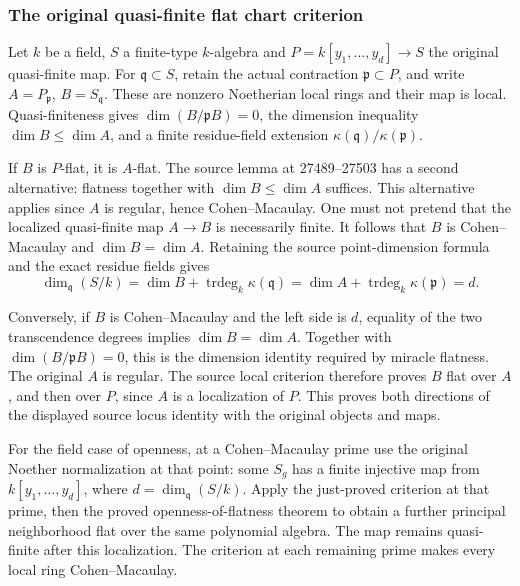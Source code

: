 \subsubsection{The original quasi-finite flat chart criterion}\label{algebra-proof-040-the-original-quasi-finite-flat-chart-criterion}

Let \(k\) be a field, \(S\) a finite-type \(k\)-algebra and \(P=k[y_1,\ldots,y_d]\to S\) the original quasi-finite map. For \(\mathfrak q\subset S\), retain the actual contraction \(\mathfrak p\subset P\), and write \(A=P_{\mathfrak p}\), \(B=S_{\mathfrak q}\). These are nonzero Noetherian local rings and their map is local. Quasi-finiteness gives \(\dim(B/\mathfrak pB)=0\), the dimension inequality \(\dim B\leq\dim A\), and a finite residue-field extension \(\kappa(\mathfrak q)/\kappa(\mathfrak p)\).

If \(B\) is \(P\)-flat, it is \(A\)-flat. The source lemma at 27489--27503 has a second alternative: flatness together with \(\dim B\leq\dim A\) suffices. This alternative applies since \(A\) is regular, hence Cohen--Macaulay. One must not pretend that the localized quasi-finite map \(A\to B\) is necessarily finite. It follows that \(B\) is Cohen--Macaulay and \(\dim B=\dim A\). Retaining the source point-dimension formula and the exact residue fields gives \[
\dim_{\mathfrak q}(S/k)
=\dim B+\operatorname{trdeg}_k\kappa(\mathfrak q)
=\dim A+\operatorname{trdeg}_k\kappa(\mathfrak p)=d.
\]

Conversely, if \(B\) is Cohen--Macaulay and the left side is \(d\), equality of the two transcendence degrees implies \(\dim B=\dim A\). Together with \(\dim(B/\mathfrak pB)=0\), this is the dimension identity required by miracle flatness. The original \(A\) is regular. The source local criterion therefore proves \(B\) flat over \(A\), and then over \(P\), since \(A\) is a localization of \(P\). This proves both directions of the displayed source locus identity with the original objects and maps.

For the field case of openness, at a Cohen--Macaulay prime use the original Noether normalization at that point: some \(S_g\) has a finite injective map from \(k[y_1,\ldots,y_d]\), where \(d=\dim_{\mathfrak q}(S/k)\). Apply the just-proved criterion at that prime, then the proved openness-of-flatness theorem to obtain a further principal neighborhood flat over the same polynomial algebra. The map remains quasi-finite after this localization. The criterion at each remaining prime makes every local ring Cohen--Macaulay.

